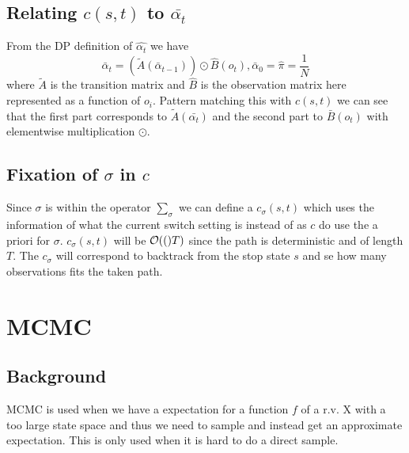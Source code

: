 \documentclass[a4paper,11pt]{kth-mag}
\begin{document}
            \subsection{Relating $c\left(s,t\right)$ to $\bar{\alpha_t}$} 
                From the DP definition of $\hat{\alpha_t}$ we have
                \begin{equation}
                    \bar{\alpha}_{t} 
                    = (\widetilde{A}({\bar{\alpha}_{t-1}}))\odot \hat{B}(o_t)
                    , \bar{\alpha}_0=\hat{\pi}=\frac{1}{N}
                \end{equation}
                where $\widetilde{A}$ is the transition matrix and $\hat{B}$ is the 
                observation matrix here represented as a function of $o_i$.
                Pattern matching this with $c(s,t)$ we can see that the first part corresponds to
                $\widetilde{A}(\bar{\alpha_t})$ and the second part to 
                $\bar{B}(o_t)$ with elementwise multiplication $\odot$.

            \subsection{Fixation of $\sigma$ in $c$}
                Since $\sigma$ is within the operator $\sum\limits_\sigma$ we can define a
                $c_\sigma(s,t)$ which uses the information of what the current 
                switch setting is instead of as $c$ do use the a priori for $\sigma$.
                $c_\sigma(s,t)$ will be $\mathcal{O}{\left((\right)}T)$ since the path is 
                deterministic and of length $T$. The $c_\sigma$ will correspond to backtrack from the stop state $s$ and se how many observations fits the taken path.

        \section{MCMC}
            \subsection{Background}
                MCMC is used when we have a expectation for a function $f$ of a r.v. X with a too large state space 
                and thus we need to sample and instead get an approximate expectation. This is only used when it is hard to do a direct sample.
                
\end{document}

